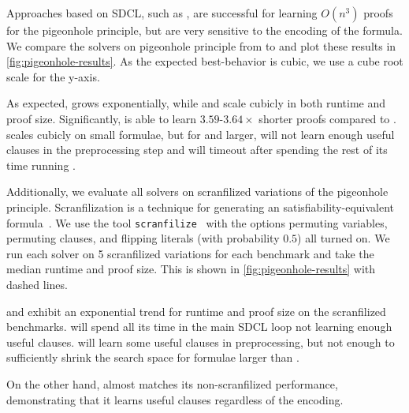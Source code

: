 Approaches based on SDCL, such as \sadical, are successful for learning $O(n^3)$
proofs for the pigeonhole principle, but are very sensitive to the encoding of
the formula. We compare the solvers on pigeonhole principle from  to
 and plot these results in \autoref{fig:pigeonhole-results}. As the
expected best-behavior is cubic, we use a cube root scale for the y-axis.

As expected, \cadical grows exponentially, while \sadical and \tool scale
cubicly in both runtime and proof size. Significantly, \tool is able to learn
$3.59$-$3.64\times$ shorter proofs compared to \sadical. 
\prelearn scales cubicly on small formulae, but for  and larger, will not
learn enough useful \pr clauses in the preprocessing step and will timeout after
spending the rest of its time running \cadical.


Additionally, we evaluate all solvers on scranfilized variations of the
pigeonhole principle. Scranfilization is a technique for generating an
satisfiability-equivalent formula~\cite{scranfilize}. We use the tool
\texttt{scranfilize}~\cite{scranfilize} with the options permuting variables,
permuting clauses, and flipping literals (with probability $0.5$) all turned on.
We run each solver on 5 scranfilized variations for each benchmark and take the
median runtime and proof size. This is shown in \autoref{fig:pigeonhole-results}
with dashed lines.

\sadical and \prelearn exhibit an exponential trend for runtime and proof size
on the scranfilized benchmarks. \sadical will spend all its time in the main
SDCL loop not learning enough useful clauses. \prelearn will learn some useful
\pr clauses in preprocessing, but not enough to sufficiently shrink the search
space for formulae larger than .

On the other hand, \tool almost matches its non-scranfilized performance,
demonstrating that it learns useful \pr clauses regardless of the encoding.




